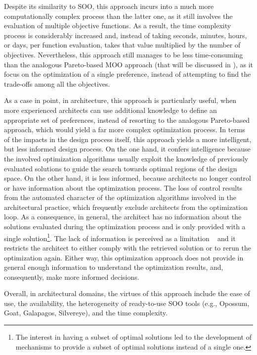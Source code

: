 	Despite its similarity to \ac{SOO}, this approach incurs into a much more computationally complex process than the latter one, as it still involves the evaluation of multiple objective functions. As a result, the time complexity process is considerably increased and, instead of taking seconds, minutes, hours, or days, per function evaluation, takes that value multiplied by the number of objectives. Nevertheless, this approach still manages to be less time-consuming than the analogous Pareto-based \ac{MOO} approach (that will be discussed in ), as it focus on the optimization of a single preference, instead of attempting to find the trade-offs among all the objectives. 
	
	As a case in point, in architecture, this approach is particularly useful, when more experienced architects can use additional knowledge to define an appropriate set of preferences, instead of resorting to the analogous Pareto-based approach, which would yield a far more complex optimization process. In terms of the impacts in the design process itself, this approach yields a more intelligent, but less informed design process. On the one hand, it confers intelligence because the involved optimization algorithms usually exploit the knowledge of previously evaluated solutions to guide the search towards optimal regions of the design space. On the other hand, it is less informed, because architects no longer control or have information about the optimization process. The loss of control results from the automated character of the optimization algorithms involved in the architectural practice, which frequently exclude architects from the optimization loop. As a consequence, in general, the architect has no information about the solutions evaluated during the optimization process and is only provided with a single solution\footnote{The interest in having a subset of optimal solutions led to the development of mechanisms to provide a subset of optimal solutions instead of a single one.}. The lack of information is perceived as a limitation ~\cite{Cichocka2017SURVEY} and it restricts the architect to either comply with the retrieved solution or to rerun the optimization again. Either way, this optimization approach does not provide in general enough information to understand the optimization results, and, consequently, make more informed decisions. 
	
	Overall, in architectural domains, the virtues of this approach include the ease of use, the availability, the heterogeneity of ready-to-use \ac{SOO} tools (e.g., Opossum, Goat, Galapagos, Silvereye), and the time complexity. %
	
